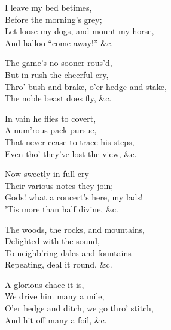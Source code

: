\settowidth{\versewidth}{Thro’ bush and brake, o’er hedge and stake,}
\begin{dcverse}\begin{altverse}
I leave my bed betimes,\\
Before the morning’s grey;\\
Let loose my dogs, and mount my horse,\\
And halloo “come away!” \&c.
\end{altverse}

\begin{altverse}
The game’s no sooner rous’d,\\
But in rush the cheerful cry,\\
Thro’ bush and brake, o’er hedge and stake,\\
The noble beast does fly, \&c.
\end{altverse}

\begin{altverse}
In vain he flies to covert,\\
A num’rous pack pursue,\\
That never cease to trace his steps,\\
Even tho’ they’ve lost the view, \&c.
\end{altverse}

\begin{altverse}
Now sweetly in full cry\\
Their various notes they join;\\
Gods! what a concert’s here, my lads!\\
’Tis more than half divine, \&c.
\end{altverse}

\begin{altverse}
The woods, the rocks, and mountains,\\
Delighted with the sound,\\
To neighb’ring dales and fountains\\
Repeating, deal it round, \&c.
\end{altverse}

\begin{altverse}
A glorious chace it is,\\
We drive him many a mile,\\
O’er hedge and ditch, we go thro’ stitch,\\
And hit off many a foil, \&c.
\end{altverse}
\end{dcverse}
\pagebreak

